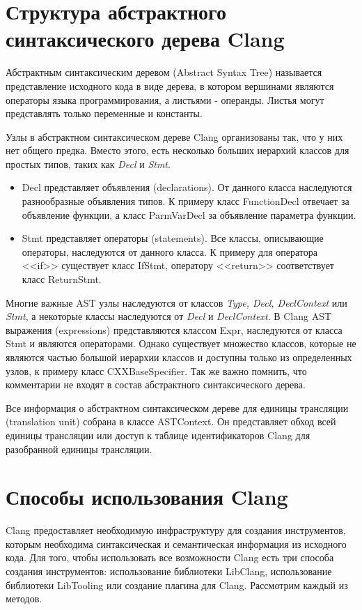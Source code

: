 \section{Структура абстрактного синтаксического дерева Clang}
Абстрактным синтаксическим деревом (Abstract Syntax Tree) называется представление исходного кода 
в виде дерева, в котором вершинами являются операторы языка программирования, а листьями - операнды.
Листья могут представлять только переменные и константы. 

Узлы в абстрактном синтаксическом дереве Clang организованы так, что у них нет общего предка.
Вместо этого, есть несколько больших иерархий классов для простых типов, таких как {\em Decl} и {\em Stmt}.
\begin{itemize}
	\item Decl представляет объявления (declarations). От данного класса наследуются разнообразные
объявления типов. К примеру класс FunctionDecl отвечает за объявление функции, а класс ParmVarDecl 
за объявление параметра функции.
	\item Stmt представляет операторы (statements). Все классы, описывающие операторы, наследуются
от данного класса. К примеру для оператора <<if>> существует класс IfStmt, оператору <<return>> 
соответствует класс ReturnStmt. 
\end{itemize}
Многие важные AST узлы наследуются от классов {\em Type, Decl, DeclContext} или {\em Stmt}, а некоторые классы 
наследуются от {\em Decl} и {\em DeclContext}. В Clang AST выражения (expressions) представляются классом Expr,
наследуются от класса Stmt и являются операторами. Однако существует множество классов, 
которые не являются частью большой иерархии классов и доступны только из определенных узлов, 
к примеру класс CXXBaseSpecifier. Так же важно помнить, что комментарии не входят в состав 
абстрактного синтаксического дерева.

Все информация о абстрактном синтаксическом дереве для единицы трансляции (translation unit)
собрана в классе ASTContext. Он представляет обход всей единицы трансляции или доступ к таблице
идентификаторов Clang для разобранной единицы трансляции. 

\section{Способы использования Clang}
Clang предоставляет необходимую инфраструктуру для создания инструментов, которым необходима
синтаксическая и семантическая информация из исходного кода. Для того, чтобы использовать все 
возможности Clang есть три способа создания инструментов: использование библиотеки LibClang, 
использование библиотеки LibTooling или создание плагина для Clang. Рассмотрим каждый из методов.


